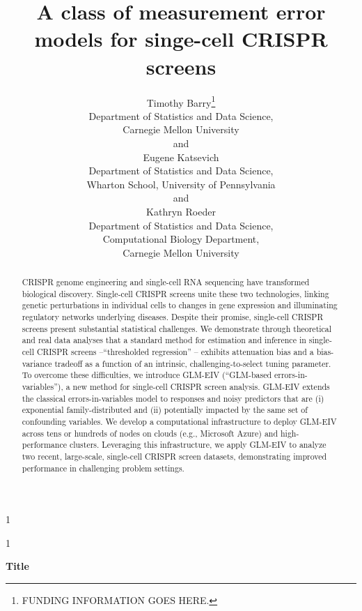 \documentclass[12pt]{article}
\newcommand{\blind}{1}
\begin{document}
	
\def\spacingset#1{\renewcommand{\baselinestretch}%
{#1}\small\normalsize} \spacingset{1}
\blind
{
	\title{\bf A class of measurement error models for singe-cell CRISPR screens}
	\author{Timothy Barry\thanks{ FUNDING INFORMATION GOES HERE.}\hspace{.2cm}\\
		Department of Statistics and Data Science,\\Carnegie Mellon University\\
		and\\
		Eugene Katsevich\\
		Department of Statistics and Data Science,\\Wharton School, University of Pennsylvania\\
		and\\
		Kathryn Roeder\\
		Department of Statistics and Data Science,\\Computational Biology Department,\\ 
		Carnegie Mellon University}
	\maketitle
} \fi

\blind
{
	\bigskip
	\bigskip
	\bigskip
	\begin{center}
		{\LARGE\bf Title}
	\end{center}
	\medskip
} \fi

\bigskip
\begin{abstract}
CRISPR genome engineering and single-cell RNA sequencing have transformed biological discovery. Single-cell CRISPR screens unite these two technologies, linking genetic perturbations in individual cells to changes in gene expression and illuminating regulatory networks underlying diseases. Despite their promise, single-cell CRISPR screens present substantial statistical challenges. We demonstrate through theoretical and real data analyses that a standard method for estimation and inference in single-cell CRISPR screens --``thresholded regression'' -- exhibits attenuation bias and a bias-variance tradeoff as a function of an intrinsic, challenging-to-select tuning parameter. To overcome these difficulties, we introduce GLM-EIV (``GLM-based errors-in-variables''), a new method for single-cell CRISPR screen analysis. GLM-EIV extends the classical errors-in-variables model to responses and noisy predictors that are (i) exponential family-distributed and (ii) potentially impacted by the same set of confounding variables. We develop a computational infrastructure to deploy GLM-EIV across tens or hundreds of nodes on clouds (e.g., Microsoft Azure) and high-performance clusters. Leveraging this infrastructure, we apply GLM-EIV to analyze two recent, large-scale, single-cell CRISPR screen datasets, demonstrating improved performance in challenging problem settings.
\end{abstract}
\end{document}
